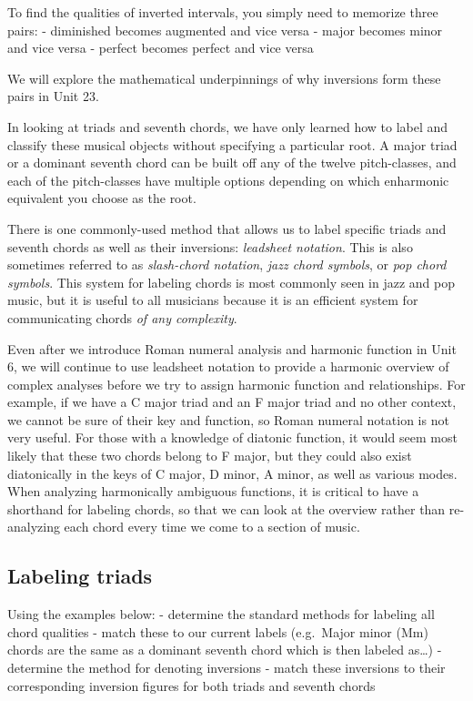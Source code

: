 \documentclass{book}
\begin{document}
To find the qualities of inverted intervals, you simply need to memorize three
pairs: - diminished becomes augmented and vice versa - major becomes minor and
vice versa - perfect becomes perfect and vice versa

We will explore the mathematical underpinnings of why inversions form these
pairs in Unit 23.

In looking at triads and seventh chords, we have only learned how to label and
classify these musical objects without specifying a particular root. A major
triad or a dominant seventh chord can be built off any of the twelve
pitch-classes, and each of the pitch-classes have multiple options depending
on which enharmonic equivalent you choose as the root.

There is one commonly-used method that allows us to label specific triads and
seventh chords as well as their inversions: \emph{leadsheet notation}. This is
also sometimes referred to as \emph{slash-chord notation}, \emph{jazz chord
symbols}, or \emph{pop chord symbols}. This system for labeling chords is most
commonly seen in jazz and pop music, but it is useful to all musicians because
it is an efficient system for communicating chords \emph{of any complexity}.

Even after we introduce Roman numeral analysis and harmonic function in Unit
6, we will continue to use leadsheet notation to provide a harmonic overview
of complex analyses before we try to assign harmonic function and
relationships. For example, if we have a C major triad and an F major triad
and no other context, we cannot be sure of their key and function, so Roman
numeral notation is not very useful. For those with a knowledge of diatonic
function, it would seem most likely that these two chords belong to F major,
but they could also exist diatonically in the keys of C major, D minor, A
minor, as well as various modes. When analyzing harmonically ambiguous
functions, it is critical to have a shorthand for labeling chords, so that we
can look at the overview rather than re-analyzing each chord every time we
come to a section of music.

\hypertarget{labeling-triads}{%
\subsection{Labeling triads}\label{labeling-triads}}

Using the examples below: - determine the standard methods for labeling all
chord qualities - match these to our current labels (e.g.~Major minor (Mm)
chords are the same as a dominant seventh chord which is then labeled
as\ldots) - determine the method for denoting inversions - match these
inversions to their corresponding inversion figures for both triads and
seventh chords
\end{document}
